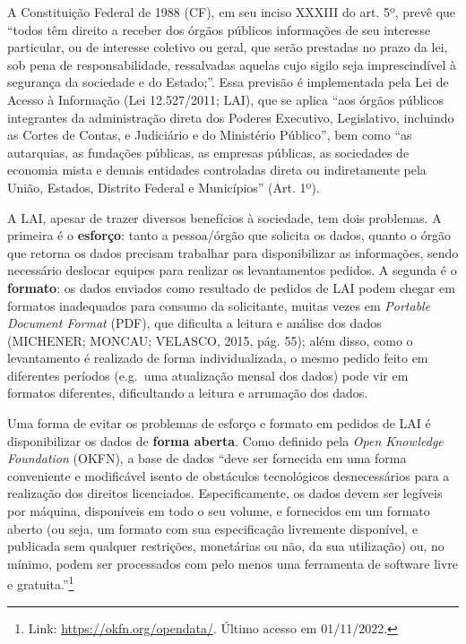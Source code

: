 \documentclass[12pt,twoside,brazilian]{book}
\begin{document}
A Constituição Federal de 1988 (CF), em seu inciso XXXIII do art. 5º,
prevê que ``todos têm direito a receber dos órgãos públicos informações
de seu interesse particular, ou de interesse coletivo ou geral, que
serão prestadas no prazo da lei, sob pena de responsabilidade,
ressalvadas aquelas cujo sigilo seja imprescindível à segurança da
sociedade e do Estado;''. Essa previsão é implementada pela Lei de
Acesso à Informação (Lei 12.527/2011; LAI), que se aplica ``aos órgãos
públicos integrantes da administração direta dos Poderes Executivo,
Legislativo, incluindo as Cortes de Contas, e Judiciário e do Ministério
Público'', bem como ``as autarquias, as fundações públicas, as empresas
públicas, as sociedades de economia mista e demais entidades controladas
direta ou indiretamente pela União, Estados, Distrito Federal e
Municípios'' (Art. 1º).

A LAI, apesar de trazer diversos benefícios à sociedade, tem dois
problemas. A primeira é o \textbf{esforço}: tanto a pessoa/órgão que
solicita os dados, quanto o órgão que retorna os dados precisam
trabalhar para disponibilizar as informações, sendo necessário deslocar
equipes para realizar os levantamentos pedidos. A segunda é o
\textbf{formato}: os dados enviados como resultado de pedidos de LAI
podem chegar em formatos inadequados para consumo da solicitante, muitas
vezes em \emph{Portable Document Format} (PDF), que dificulta a leitura
e análise dos dados (MICHENER; MONCAU; VELASCO, 2015, pág. 55); além
disso, como o levantamento é realizado de forma individualizada, o mesmo
pedido feito em diferentes períodos (e.g.~uma atualização mensal dos
dados) pode vir em formatos diferentes, dificultando a leitura e
arrumação dos dados.

Uma forma de evitar os problemas de esforço e formato em pedidos de LAI
é disponibilizar os dados de \textbf{forma aberta}. Como definido pela
\emph{Open Knowledge Foundation} (OKFN), a base de dados ``deve ser
fornecida em uma forma conveniente e modificável isento de obstáculos
tecnológicos desnecessários para a realização dos direitos licenciados.
Especificamente, os dados devem ser legíveis por máquina, disponíveis em
todo o seu volume, e fornecidos em um formato aberto (ou seja, um
formato com sua especificação livremente disponível, e publicada sem
qualquer restrições, monetárias ou não, da sua utilização) ou, no
mínimo, podem ser processados com pelo menos uma ferramenta de software
livre e gratuita.''\footnote{Link: \url{https://okfn.org/opendata/}.
  Último acesso em 01/11/2022.}
\end{document}
